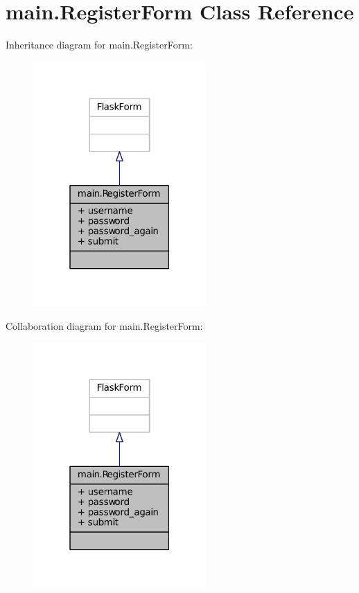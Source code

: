 \hypertarget{classmain_1_1RegisterForm}{}\section{main.\+Register\+Form Class Reference}
\label{classmain_1_1RegisterForm}


Inheritance diagram for main.\+Register\+Form\+:
\nopagebreak
\begin{figure}[H]
\begin{center}
\leavevmode
\includegraphics[width=187pt]{classmain_1_1RegisterForm__inherit__graph}
\end{center}
\end{figure}


Collaboration diagram for main.\+Register\+Form\+:
\nopagebreak
\begin{figure}[H]
\begin{center}
\leavevmode
\includegraphics[width=187pt]{classmain_1_1RegisterForm__coll__graph}
\end{center}
\end{figure}
